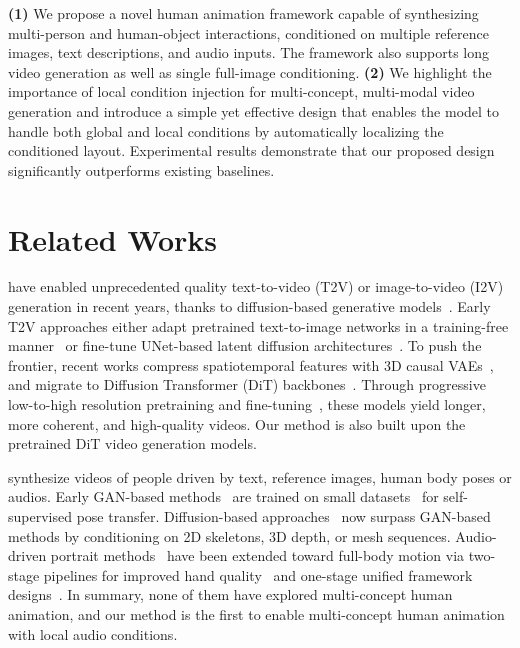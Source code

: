 \documentclass{article} %
\begin{document}
 
{\bf (1)} We propose a novel human animation framework capable of synthesizing multi-person and human-object interactions, conditioned on multiple reference images, text descriptions, and audio inputs. The framework also supports long video generation as well as single full-image conditioning.
{\bf (2)} We highlight the importance of local condition injection for multi-concept, multi-modal video generation and introduce a simple yet effective design that enables the model to handle both global and local conditions by automatically localizing the conditioned layout. Experimental results demonstrate that our proposed design significantly outperforms existing baselines.


\section{Related Works}

 have enabled unprecedented quality text-to-video (T2V) or image-to-video (I2V) generation in recent years, thanks to diffusion-based generative models~\citep{jonathan2020ddpm, song2021ddim, karras2022edm, song2020score, liu2022flow}. Early T2V approaches either adapt pretrained text-to-image networks in a training-free manner~\citep{singer2022make, wu2023tune, qi2023fatezero} or fine-tune UNet-based latent diffusion architectures~\citep{guo2024animatediff,zhou2022magicvideo,svd,wang2023modelscope}. To push the frontier, recent works compress spatiotemporal features with 3D causal VAEs~\citep{yu20233DVAE}, and migrate to Diffusion Transformer (DiT) backbones~\citep{vaswani2017attention,peebles2023scalable, videoworldsimulators2024, hong2022cogvideo}. Through progressive low-to-high resolution pretraining and fine-tuning~\citep{polyak2024moviegen, kong2024hunyuanvideo,wang2025wan}, these models yield longer, more coherent, and high-quality videos. Our method is also built upon the pretrained DiT video generation models.


 synthesize videos of people driven by text, reference images, human body poses or audios. Early GAN-based methods~\citep{siarohin2019fomm, zhao2022tps, siarohin2021mraa, jiang2024mobileportrait, wang2021facev2v} are trained on small datasets~\citep{nagrani2017voxceleb, siarohin2019fomm, xie2022vfhq, zhu2022celebv} for self-supervised pose transfer. Diffusion-based approaches~\citep{shao2024human4dit, zhang2024mimicmotion, aa,DBLP:conf/nips/00010ZF0LTCX0L24,wang2025multi} now surpass GAN-based methods by conditioning on 2D skeletons, 3D depth, or mesh sequences. Audio-driven portrait methods~\citep{GeneFace, zhang2023sadtalker, emo, jiang2024loopy, hallo3} have been extended toward full-body motion via two-stage pipelines for improved hand quality~\citep{VLogger, EchomimicV2, EMO2, diffted} and one-stage unified framework designs~\citep{lin2024cyberhost,lin2025omnihuman}. In summary, none of them have explored multi-concept human animation, and our method is the first to enable multi-concept human animation with local audio conditions.
\end{document}
